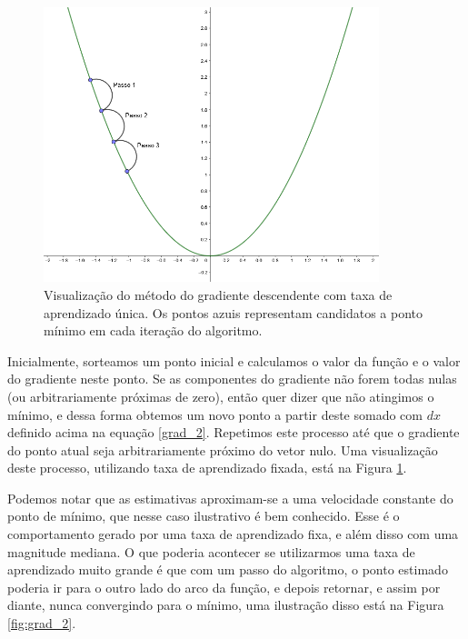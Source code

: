 \begin{figure}[htb]
\centering
\includegraphics[height=8cm]{figuras/grad_1}
\caption{Visualização do método do gradiente descendente com taxa de aprendizado única. Os pontos azuis representam candidatos a ponto mínimo em cada iteração do algoritmo.}
\label{fig:grad_1}
\end{figure}

Inicialmente, sorteamos um ponto inicial e calculamos o valor da função e o valor do gradiente neste ponto. Se as componentes do gradiente não forem todas nulas (ou arbitrariamente próximas de zero), então quer dizer que não atingimos o mínimo, e dessa forma obtemos um novo ponto a partir deste somado com $dx$ definido acima na equação \ref{grad_2}. Repetimos este processo até que o gradiente do ponto atual seja arbitrariamente próximo do vetor nulo. Uma visualização deste processo, utilizando taxa de aprendizado fixada, está na Figura \ref{fig:grad_1}.

Podemos notar que as estimativas aproximam-se a uma velocidade constante do ponto de mínimo, que nesse caso ilustrativo é bem conhecido. Esse é o comportamento gerado por uma taxa de aprendizado fixa, e além disso com uma magnitude mediana. O que poderia acontecer se utilizarmos uma taxa de aprendizado muito grande é que com um passo do algoritmo, o ponto estimado poderia ir para o outro lado do arco da função, e depois retornar, e assim por diante, nunca convergindo para o mínimo, uma ilustração disso está na Figura \ref{fig:grad_2}.

